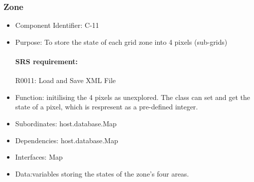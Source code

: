 \documentclass[11pt, a4paper]{report}
\begin{document}
\subsubsection{Zone}
\begin{itemize}
\item Component Identifier: C-11
\item Purpose: To store the state of each grid zone into 4 pixels (sub-grids) 
\paragraph{SRS requirement:} R0011: Load and Save XML File
\item Function: initilising the 4 pixels as unexplored. The class can set and get the state
of a pixel, which is respresent as a pre-defined integer. 
\item Subordinates: host.database.Map
\item Dependencies: host.database.Map
\item Interfaces: Map
\item Data:variables storing the states of the zone's four areas.
\end{itemize}

\end{document}
